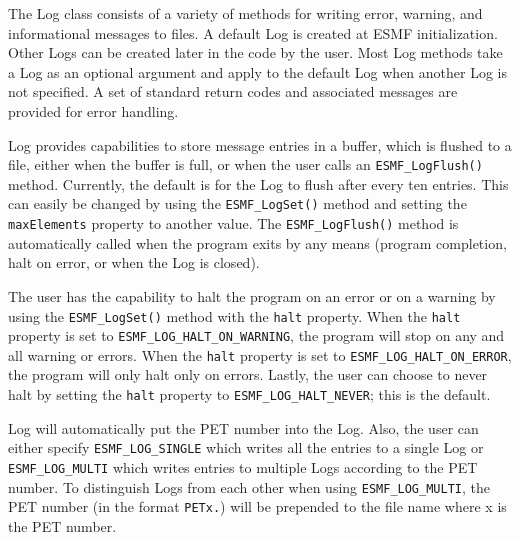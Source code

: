 


\label{sec:Log}

The Log class consists of a variety of methods for writing error, warning, and
informational messages to files.  A default Log is created at ESMF
initialization.  Other Logs can be created later in the code by the user.  Most
Log methods take a Log as an optional argument and apply to the default Log
when another Log is not specified.  A set of standard return codes and
associated messages are provided for error handling.  

Log provides capabilities to store message entries in a buffer, which is 
flushed to a file, either when the buffer is full, or when the user calls an 
{\tt ESMF\_LogFlush()} method.  Currently, the default is for the Log to flush
after every ten entries.  This can easily be changed by using the 
{\tt ESMF\_LogSet()} method and setting the {\tt maxElements} property to 
another value.  The {\tt ESMF\_LogFlush()} method is automatically called when 
the program exits by any means (program completion, halt on error, or when the
Log is closed).

The user has the capability to halt the program on an error or on a warning by
using the {\tt ESMF\_LogSet()} method with the {\tt halt} property.  When the 
{\tt halt} property is set to {\tt ESMF\_LOG\_HALT\_ON\_WARNING}, the program will 
stop on any and all warning or errors.  When the {\tt halt} property is set to 
{\tt ESMF\_LOG\_HALT\_ON\_ERROR}, the program will only halt only on errors.  Lastly,
the user can choose to never halt by setting the {\tt halt} property to 
{\tt ESMF\_LOG\_HALT\_NEVER}; this is the default.

Log will automatically put the PET number into the Log.  Also, the user can 
either specify {\tt ESMF\_LOG\_SINGLE} which writes all the entries to a single 
Log or {\tt ESMF\_LOG\_MULTI} which writes entries to multiple Logs according to 
the PET number.  To distinguish Logs from each other when using 
{\tt ESMF\_LOG\_MULTI}, the PET number (in the format {\tt PETx.}) will be 
prepended to the file name where x is the PET number.

